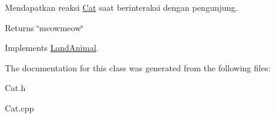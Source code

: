 Mendapatkan reaksi \hyperlink{classCat}{Cat} saat berinteraksi dengan pengunjung. 

\begin{DoxyReturn}{Returns}
\char`\"{}meowmeow\char`\"{} 
\end{DoxyReturn}


Implements \hyperlink{classLandAnimal}{Land\-Animal}.



The documentation for this class was generated from the following files\-:\begin{DoxyCompactItemize}
\item 
Cat.\-h\item 
Cat.\-cpp\end{DoxyCompactItemize}
